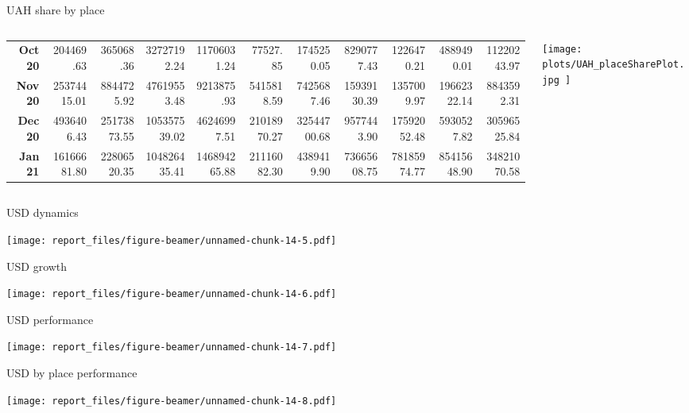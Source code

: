 \documentclass[ignorenonframetext,]{beamer}
\begin{document}
\begin{frame}{UAH share by place}
\begin{columns}
\begin{column}{0.6\textwidth}
\begin{table}[ht]
{\begin{tabular}{rrrrrrrrrrr}
  {\textbf{Oct 20}} & 204469.63 & 365068.36 & 32727192.24 & 11706031.24 & 77527.85 & 1745250.05 & 8290777.43 & 1226470.21 & 4889490.01 & 11220243.97 \\ 
  {\textbf{Nov 20}} & 25374415.01 & 8844725.92 & 47619553.48 & 9213875.93 & 5415818.59 & 7425687.46 & 15939130.39 & 1357009.97 & 19662322.14 & 8843592.31 \\ 
  {\textbf{Dec 20}} & 4936406.43 & 25173873.55 & 105357539.02 & 46246997.51 & 21018970.27 & 32544700.68 & 9577443.90 & 17592052.48 & 5930527.82 & 30596525.84 \\ 
  {\textbf{Jan 21}} & 16166681.80 & 22806520.35 & 104826435.41 & 146894265.88 & 21116082.30 & 4389419.90 & 73665608.75 & 78185974.77 & 85415648.90 & 34821070.58 \\ 
   \hline
\end{tabular}
}
\end{table}
\end{column}\begin{column}{0.4\textwidth}\vspace*{-6cm}\hspace*{-0.5cm}\texttt{[image:  plots/UAH\_placeSharePlot.jpg ]}\end{column}\end{columns}

\end{frame}

\begin{frame}{USD dynamics}
\protect\hypertarget{usd-dynamics}{}

\texttt{[image: report\_files/figure-beamer/unnamed-chunk-14-5.pdf]}

\end{frame}

\begin{frame}{USD growth}
\protect\hypertarget{usd-growth}{}

\texttt{[image: report\_files/figure-beamer/unnamed-chunk-14-6.pdf]}

\end{frame}

\begin{frame}{USD performance}
\protect\hypertarget{usd-performance}{}

\texttt{[image: report\_files/figure-beamer/unnamed-chunk-14-7.pdf]}

\end{frame}

\begin{frame}{USD by place performance}
\protect\hypertarget{usd-by-place-performance}{}

\texttt{[image: report\_files/figure-beamer/unnamed-chunk-14-8.pdf]}

\end{frame}
\end{document}
